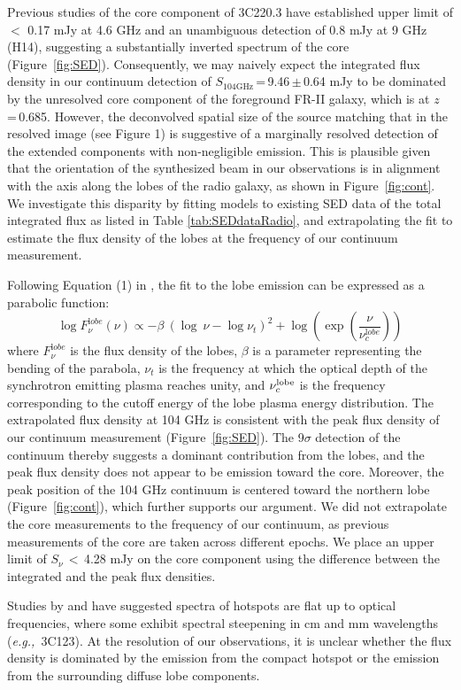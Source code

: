 \documentclass[twocolumn,apj,numberedappendix]{emulateapj}
\newcommand{\eg}{{\sl e.g.,~}}
\begin{document}
Previous studies of the core component of 3C220.3 have established upper 
limit of $<$ 0.17 mJy at 4.6 GHz \citep{Mullin06a} and an unambiguous detection of 0.8 mJy at 9 GHz (H14), suggesting a substantially inverted spectrum of the core (Figure~\ref{fig:SED}).
Consequently, we may naively expect the integrated flux density in our continuum detection of $S_\textrm{104GHz}$\,=\,9.46\,$\pm$\,0.64\,\,mJy to be dominated by the unresolved core component of the foreground FR-II galaxy, which is at $z$\,=\,0.685. 
However, the deconvolved spatial size of the source matching that in the resolved image (see Figure 1) is 
suggestive of a marginally resolved detection of the extended components with non-negligible emission. 
This is plausible given that the orientation of the synthesized beam in our observations is in alignment with the 
axis along the 
lobes of the radio galaxy, as shown in Figure~\ref{fig:cont}. We investigate this disparity by fitting models to 
existing SED data of the total integrated flux as listed in Table \ref{tab:SEDdataRadio}, and extrapolating the fit to 
estimate the flux density of the lobes at the frequency of our continuum measurement. 

Following Equation (1) in \citet{Cleary07a}, the fit to the lobe emission can be expressed as a parabolic function:
\begin{equation}
\log F_{\nu}^{\mathrm lobe} (\nu) \propto - \beta\ (\log\ \nu - \log \nu_{t})^2  + \log (\exp({\frac{\nu}{\nu_c^{\mathrm lobe}}}))
\end{equation}
where $F_{\nu}^{\mathrm lobe}$ is the flux density of the lobes, $\beta$ is a parameter representing the bending 
of the parabola, $\nu_t$ is the frequency at which the optical depth of the synchrotron emitting plasma reaches 
unity, and $\nu_c^{\rm lobe}$ is the frequency corresponding to the cutoff energy of the lobe plasma energy 
distribution. 
The extrapolated flux density at 104\,\,GHz is consistent with the peak flux density of our continuum 
measurement (Figure~\ref{fig:SED}). The 9$\sigma$ detection of the continuum thereby suggests
a dominant contribution from the lobes, and the peak flux density does not appear to be emission toward 
the core. Moreover, the peak position of the 104\,\,GHz continuum is
centered toward the northern lobe (Figure~\ref{fig:cont}), which further supports our argument. We did not 
extrapolate the core measurements to the frequency of our continuum, as previous measurements of the core are 
taken 
across different epochs. 
We place an upper limit of $S_\nu$\,$<$\,4.28 mJy on the core component using the difference between the integrated and the peak flux densities.
\par
Studies by \citet{Meisenheimer89a} and \citet{Hardcastle08a} have suggested spectra of hotspots are flat up to optical frequencies, where some exhibit spectral steepening in cm and mm wavelengths (\eg 3C123). At the resolution of our observations, it is unclear whether the flux density is dominated by the emission from the compact hotspot or the emission from the surrounding diffuse lobe components.
\end{document}
